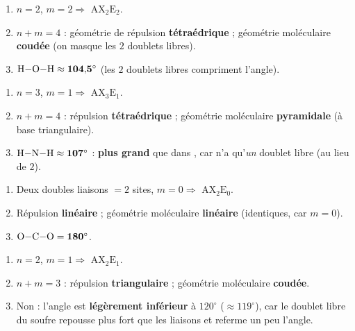 \documentclass[11pt,a4paper]{article}
\begin{document}
\newcommand{\AX}[2]{\ensuremath{\mathrm{AX_{#1}E_{#2}}}}
\begin{corrige}[l'eau \ce{H2O}]
\begin{enumerate}[label=\alph*)]
  \item $n=2$, $m=2 \Rightarrow$ \AX{2}{2}.
  \item $n+m = 4$ : géométrie de répulsion \textbf{tétraédrique} ; géométrie moléculaire
        \textbf{coudée} (on masque les $2$ doublets libres).
  \item $\ce{H-O-H} \approx \mathbf{104{,}5^\circ}$ (les $2$ doublets libres compriment l'angle).
\end{enumerate}
\end{corrige}

\begin{corrige}[l'ammoniac \ce{NH3}]
\begin{enumerate}[label=\alph*)]
  \item $n=3$, $m=1 \Rightarrow$ \AX{3}{1}.
  \item $n+m=4$ : répulsion \textbf{tétraédrique} ; géométrie moléculaire \textbf{pyramidale}
        (à base triangulaire).
  \item $\ce{H-N-H} \approx \mathbf{107^\circ}$ : \textbf{plus grand} que dans , car
         n'a qu'\emph{un} doublet libre (au lieu de $2$).
\end{enumerate}
\end{corrige}

\begin{corrige}
\begin{enumerate}[label=\alph*)]
  \item Deux doubles liaisons $= 2$ sites, $m=0 \Rightarrow$ \AX{2}{0}.
  \item Répulsion \textbf{linéaire} ; géométrie moléculaire \textbf{linéaire} (identiques, car
        $m=0$).
  \item $\ce{O-C-O} = \mathbf{180^\circ}$.
\end{enumerate}
\end{corrige}

\begin{corrige}
\begin{enumerate}[label=\alph*)]
  \item $n=2$, $m=1 \Rightarrow$ \AX{2}{1}.
  \item $n+m=3$ : répulsion \textbf{triangulaire} ; géométrie moléculaire \textbf{coudée}.
  \item Non : l'angle est \textbf{légèrement inférieur} à $120^\circ$ ($\approx 119^\circ$), car le
        doublet libre du soufre repousse plus fort que les liaisons et referme un peu l'angle.
\end{enumerate}
\end{corrige}
\end{document}
